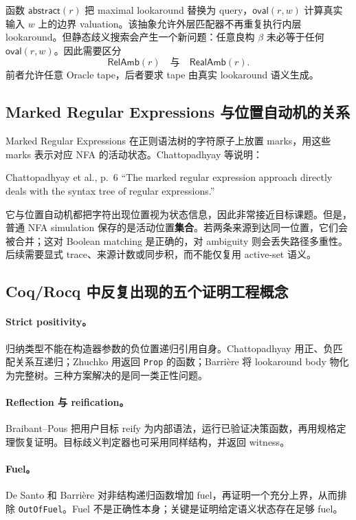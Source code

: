 \documentclass[UTF8,a4paper,12pt]{ctexart}
\newcommand{\RelAmb}{\mathsf{RelAmb}}
\newcommand{\RealAmb}{\mathsf{RealAmb}}
\newcommand{\ovalfn}{\mathsf{oval}}
\newcommand{\abstractfn}{\mathsf{abstract}}
\begin{document}
函数 $\abstractfn(r)$ 把 maximal lookaround 替换为 query，$\ovalfn(r,w)$ 计算真实输入 $w$ 上的边界 valuation。该抽象允许外层匹配器不再重复执行内层 lookaround。但静态歧义搜索会产生一个新问题：任意良构 $\beta$ 未必等于任何 $\ovalfn(r,w)$。因此需要区分
\[
\RelAmb(r)
\quad\text{与}\quad
\RealAmb(r).
\]
前者允许任意 Oracle tape，后者要求 tape 由真实 lookaround 语义生成。

\subsection{Marked Regular Expressions 与位置自动机的关系}

Marked Regular Expressions 在正则语法树的字符原子上放置 marks，用这些 marks 表示对应 NFA 的活动状态。Chattopadhyay 等说明：
\begin{paperquote}{Chattopadhyay et al., p.~6}
``The marked regular expression approach directly deals with the syntax tree of regular expressions.''
\end{paperquote}

它与位置自动机都把字符出现位置视为状态信息，因此非常接近目标课题。但是，普通 NFA simulation 保存的是活动位置\textbf{集合}。若两条来源到达同一位置，它们会被合并；这对 Boolean matching 是正确的，对 ambiguity 则会丢失路径多重性。后续需要显式 trace、来源计数或同步积，而不能仅复用 active-set 语义。

\subsection{Coq/Rocq 中反复出现的五个证明工程概念}

\paragraph{Strict positivity。}
归纳类型不能在构造器参数的负位置递归引用自身。Chattopadhyay 用正、负匹配关系互递归；Zhuchko 用返回 \texttt{Prop} 的函数；Barri\`ere 将 lookaround body 物化为完整树。三种方案解决的是同一类正性问题。

\paragraph{Reflection 与 reification。}
Braibant--Pous 把用户目标 reify 为内部语法，运行已验证决策函数，再用规格定理恢复证明。目标歧义判定器也可采用同样结构，并返回 witness。

\paragraph{Fuel。}
De Santo 和 Barri\`ere 对非结构递归函数增加 fuel，再证明一个充分上界，从而排除 \texttt{OutOfFuel}。Fuel 不是正确性本身；关键是证明给定语义状态存在足够 fuel。
\end{document}
